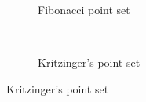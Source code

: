 \begin{figure}[tb]
  \begin{subfigure}{0.49\textwidth}
    \centering
    \caption*{Fibonacci point set}%
  \end{subfigure}~
  \begin{subfigure}{0.49\textwidth}
    \centering
    \caption*{Kritzinger's point set}%
  \end{subfigure}
\end{figure}
